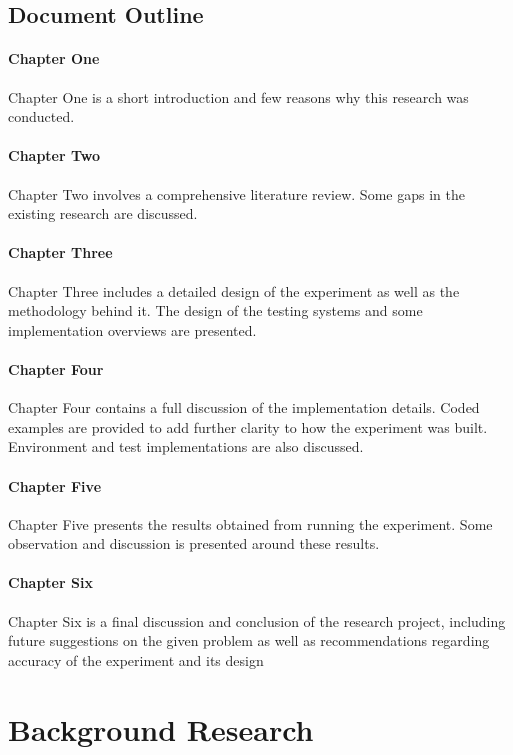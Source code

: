 \documentclass[oneside,12pt]{book}
\begin{document}
\section{Document Outline}
\subsubsection{Chapter One}
Chapter One is a short introduction and few reasons why this research was conducted.
\subsubsection{Chapter Two}
Chapter Two involves a comprehensive literature review. Some gaps in the existing research are discussed.
\subsubsection{Chapter Three}
Chapter Three includes a detailed design of the experiment as well as the methodology behind it. The design of the testing systems and some implementation overviews are presented. 
\subsubsection{Chapter Four}
Chapter Four contains a full discussion of the implementation details. Coded examples are provided to add further clarity to how the experiment was built. Environment and test implementations are also discussed. 
\subsubsection{Chapter Five}
Chapter Five presents the results obtained from running the experiment. Some observation and discussion is presented around these results. 
\subsubsection{Chapter Six}
Chapter Six is a final discussion and conclusion of the research project, including future suggestions on the given problem as well as recommendations regarding accuracy of the experiment and its design

\chapter{Background Research}
\end{document}
